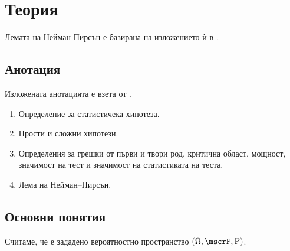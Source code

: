 \documentclass{../../common/topic}
\begin{document}
\maketitle

\section{Теория}

Лемата на Нейман-Пирсън е базирана на изложението ѝ в \cite{ДимитровЯнев2007}.

\subsection{Анотация}

Изложената анотацията е взета от \cite{Syllabus}.

\begin{enumerate}
  \item Определение за статистичека хипотеза.
  \item Прости и сложни хипотези.
  \item Определения за грешки от първи и твори род, критична област, мощност, значимост на тест и значимост на статистиката на теста.
  \item Лема на Нейман–Пирсън.
\end{enumerate}

\subsection{Основни понятия}

Считаме, че е зададено вероятностно пространство \( (\Omega, \mscrF, \Prob) \).
\end{document}
